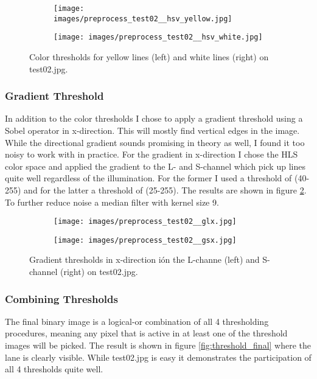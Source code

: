 \documentclass[a4paper, 11pt, DIV=14]{scrartcl}
\begin{document}
\begin{figure}[h]
    \centering
    \begin{subfigure}{0.45\textwidth}
        \texttt{[image: images/preprocess\_test02\_\_hsv\_yellow.jpg]}
    \end{subfigure}\quad
    \begin{subfigure}{0.45\textwidth}
        \texttt{[image: images/preprocess\_test02\_\_hsv\_white.jpg]}
    \end{subfigure} 
    \caption{Color thresholds for yellow lines (left) and white lines (right) on test02.jpg.}
    \label{fig:color_threshold}
\end{figure}

\subsubsection*{Gradient Threshold}
In addition to the color thresholds I chose to apply a gradient threshold using a Sobel operator in x-direction. This will mostly find vertical edges in the image. While the directional gradient sounds promising in theory as well, I found it too noisy to work with in practice. For the gradient in x-direction I chose the HLS color space and applied the gradient to the L- and S-channel which pick up lines quite well regardless of the illumination. For the former I used a threshold of (40-255) and for the latter a threshold of (25-255). The results are shown in figure \ref{fig:gradient_threshold}. To further reduce noise a median filter with kernel size 9.

\begin{figure}[h]
    \centering
    \begin{subfigure}{0.45\textwidth}
        \texttt{[image: images/preprocess\_test02\_\_glx.jpg]}
    \end{subfigure}\quad
    \begin{subfigure}{0.45\textwidth}
        \texttt{[image: images/preprocess\_test02\_\_gsx.jpg]}
    \end{subfigure} 
    \caption{Gradient thresholds in x-direction ión the L-channe (left) and S-channel (right) on test02.jpg.}
    \label{fig:gradient_threshold}
\end{figure}

\subsubsection*{Combining Thresholds}
The final binary image is a logical-or combination of all 4 thresholding procedures, meaning any pixel that is active in at least one of the threshold images will be picked. The result is shown in figure \ref{fig:threshold_final} where the lane is clearly visible. While test02.jpg is easy it demonstrates the participation of all 4 thresholds quite well.
\end{document}
